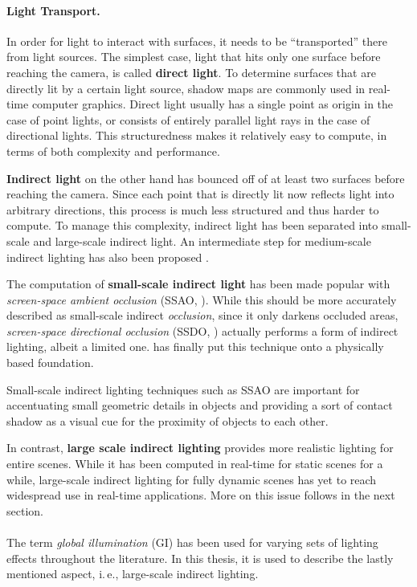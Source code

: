 \paragraph{Light Transport.}

In order for light to interact with surfaces, it needs to be ``transported'' there from light sources. The simplest case, light that hits only one surface before reaching the camera, is called \textbf{direct light}. To determine surfaces that are directly lit by a certain light source, shadow maps are commonly used in real-time computer graphics. Direct light usually has a single point as origin in the case of point lights, or consists of entirely parallel light rays in the case of directional lights. This structuredness makes it relatively easy to compute, in terms of both complexity and performance.

\textbf{Indirect light} on the other hand has bounced off of at least two surfaces before reaching the camera. Since each point that is directly lit now reflects light into arbitrary directions, this process is much less structured and thus harder to compute. To manage this complexity, indirect light has been separated into small-scale and large-scale indirect light. An intermediate step for medium-scale indirect lighting has also been proposed \citep{reed:2012:mediumAO}.

The computation of \textbf{small-scale indirect light} has been made popular with \textit{screen-space ambient occlusion} (SSAO, \cite{Mittring:2007:Cryengine2}). While this should be more accurately described as small-scale indirect \textit{occlusion}, since it only darkens occluded areas, \textit{screen-space directional occlusion} (SSDO, \cite{Ritschel:2009:SSDO}) actually performs a form of indirect lighting, albeit a limited one. \citet{jimenez:2016:AO} has finally put this technique onto a physically based foundation.

Small-scale indirect lighting techniques such as SSAO are important for accentuating small geometric details in objects and providing a sort of contact shadow as a visual cue for the proximity of objects to each other.

In contrast, \textbf{large scale indirect lighting} provides more realistic lighting for entire scenes. While it has been computed in real-time for static scenes for a while, large-scale indirect lighting for fully dynamic scenes has yet to reach widespread use in real-time applications. More on this issue follows in the next section.
\\
\\
The term \textit{global illumination} (GI) has been used for varying sets of lighting effects throughout the literature. In this thesis, it is used to describe the lastly mentioned aspect, i.\,e., large-scale indirect lighting.



